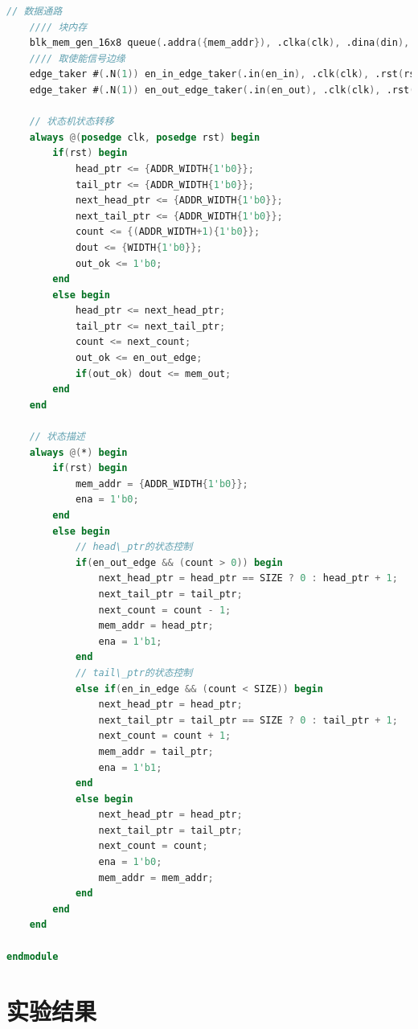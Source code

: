 \documentclass[UTF8]{article}
\begin{document}
\begin{enumerate}
\begin{lstlisting}[language=verilog]
    // 数据通路
    //// 块内存
    blk_mem_gen_16x8 queue(.addra({mem_addr}), .clka(clk), .dina(din), .douta(mem_out), .ena(ena), .wea(en_in_edge));
    //// 取使能信号边缘
    edge_taker #(.N(1)) en_in_edge_taker(.in(en_in), .clk(clk), .rst(rst), .out(en_in_edge));
    edge_taker #(.N(1)) en_out_edge_taker(.in(en_out), .clk(clk), .rst(rst), .out(en_out_edge));
    
    // 状态机状态转移
    always @(posedge clk, posedge rst) begin
        if(rst) begin
            head_ptr <= {ADDR_WIDTH{1'b0}};
            tail_ptr <= {ADDR_WIDTH{1'b0}};
            next_head_ptr <= {ADDR_WIDTH{1'b0}};
            next_tail_ptr <= {ADDR_WIDTH{1'b0}};
            count <= {(ADDR_WIDTH+1){1'b0}};
            dout <= {WIDTH{1'b0}};
            out_ok <= 1'b0;
        end
        else begin
            head_ptr <= next_head_ptr;
            tail_ptr <= next_tail_ptr;
            count <= next_count;
            out_ok <= en_out_edge;
            if(out_ok) dout <= mem_out;
        end
    end
    
    // 状态描述
    always @(*) begin
        if(rst) begin 
            mem_addr = {ADDR_WIDTH{1'b0}};
            ena = 1'b0;
        end
        else begin
            // head\_ptr的状态控制
            if(en_out_edge && (count > 0)) begin
                next_head_ptr = head_ptr == SIZE ? 0 : head_ptr + 1;
                next_tail_ptr = tail_ptr;
                next_count = count - 1;
                mem_addr = head_ptr;
                ena = 1'b1;
            end
            // tail\_ptr的状态控制
            else if(en_in_edge && (count < SIZE)) begin
                next_head_ptr = head_ptr;
                next_tail_ptr = tail_ptr == SIZE ? 0 : tail_ptr + 1;
                next_count = count + 1;
                mem_addr = tail_ptr;
                ena = 1'b1;
            end
            else begin
                next_head_ptr = head_ptr;
                next_tail_ptr = tail_ptr;
                next_count = count;
                ena = 1'b0;
                mem_addr = mem_addr;
            end
        end
    end
    
endmodule
	\end{lstlisting}
\end{enumerate}

\section{实验结果}
\end{document}
